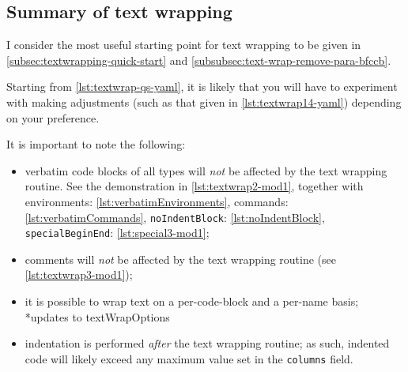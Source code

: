 \subsection{Summary of text wrapping}
	I consider%
	 the most
	useful starting point for text wrapping to be given in
	\cref{subsec:textwrapping-quick-start} and \cref{subsubsec:text-wrap-remove-para-bfccb}.

	Starting from \cref{lst:textwrap-qs-yaml}, it is likely that you will have to experiment
	with making adjustments (such as that given in \cref{lst:textwrap14-yaml}) depending on
	your preference.

	It is important to note the following:
	\begin{itemize}
		\item verbatim code blocks of all types will \emph{not} be affected by the text wrapping
		      routine. See the demonstration in \vref{lst:textwrap2-mod1}, together with environments:
		      \vref{lst:verbatimEnvironments}, commands: \vref{lst:verbatimCommands},
		      \texttt{noIndentBlock}: \cref{lst:noIndentBlock}, \texttt{specialBeginEnd}:
		      \vref{lst:special3-mod1};
		\item comments will \emph{not} be affected by the text wrapping routine (see
		      \vref{lst:textwrap3-mod1});
		\item it is possible to wrap text on a per-code-block and a per-name basis;
		      *{updates to textWrapOptions}
		\item indentation is performed \emph{after} the text wrapping routine; as such, indented code
		      will likely exceed any maximum value set in the \texttt{columns} field.
	\end{itemize}
